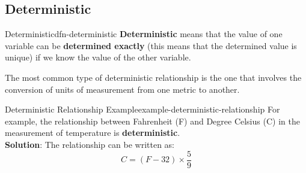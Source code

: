 \documentclass[math,code]{amznotes}
\theoremstyle{remark}
\begin{document}
\subsection{Deterministic}
\begin{dfnbox}{Deterministic}{dfn-deterministic}
    {\color{red} \textbf{Deterministic}} means that the value of one variable can be \textbf{determined exactly} (this means that the determined value is unique) if we know the value of the other variable.
\end{dfnbox}
The most common type of deterministic relationship is the one that involves the conversion of units of measurement from one metric to another.
\begin{exbox}{Deterministic Relationship Example}{example-deterministic-relationship}
    For example, the relationship between Fahrenheit (F) and Degree Celsius (C) in the measurement of temperature is \textbf{deterministic}. \\
    \textbf{Solution}: The relationship can be written as:
    \begin{equation*}
        C=(F-32)\times \frac{5}{9}
    \end{equation*}
\end{exbox}
\end{document}
